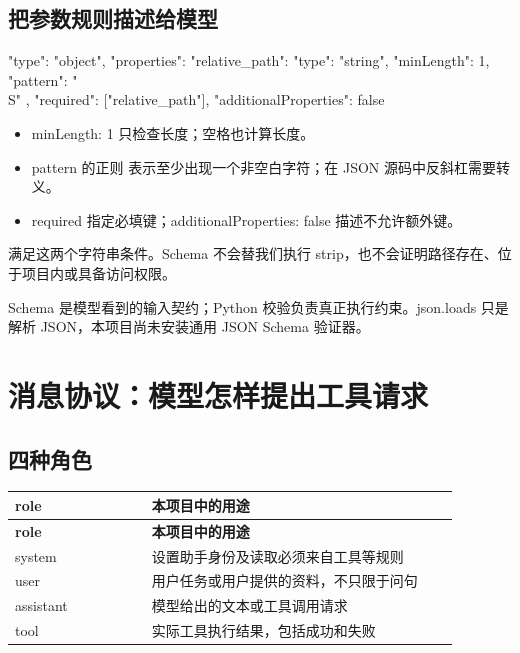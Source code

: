 \documentclass[UTF8,zihao=-4,fontset=fandol]{ctexart}
\newcommand{\code}[1]{{\small\ttfamily\detokenize{#1}}}
\begin{document}
\subsection{把参数规则描述给模型}

\begin{Code}
{
  "type": "object",
  "properties": {
    "relative_path": {
      "type": "string",
      "minLength": 1,
      "pattern": "\\S"
    }
  },
  "required": ["relative_path"],
  "additionalProperties": false
}
\end{Code}

\begin{itemize}
\item minLength: 1 只检查长度；空格也计算长度。
\item pattern 的正则 \code{\S} 表示至少出现一个非空白字符；在 JSON 源码中反斜杠需要转义。
\item required 指定必填键；additionalProperties: false 描述不允许额外键。
\end{itemize}

\code{   a   } 满足这两个字符串条件。Schema 不会替我们执行 strip，也不会证明路径存在、位于项目内或具备访问权限。

Schema 是模型看到的输入契约；Python 校验负责真正执行约束。json.loads 只是解析 JSON，本项目尚未安装通用 JSON Schema 验证器。

\section{消息协议：模型怎样提出工具请求}

\subsection{四种角色}

{\small\setlength{\tabcolsep}{4pt}
\renewcommand{\arraystretch}{1.25}
\begin{longtable}{>{\raggedright\arraybackslash}p{0.28\linewidth}>{\raggedright\arraybackslash}p{0.63\linewidth}}
\toprule
\textbf{role} & \textbf{本项目中的用途} \\
\midrule\endfirsthead
\toprule
\textbf{role} & \textbf{本项目中的用途} \\
\midrule\endhead
\bottomrule\endfoot
system & 设置助手身份及读取必须来自工具等规则 \\
user & 用户任务或用户提供的资料，不只限于问句 \\
assistant & 模型给出的文本或工具调用请求 \\
tool & 实际工具执行结果，包括成功和失败 \\
\end{longtable}}
\end{document}
